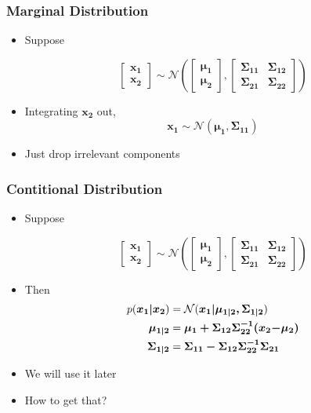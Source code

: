 \documentclass{beamer}
\begin{document}
\begin{frame}
	\frametitle{Marginal Distribution}
	\begin{itemize}
		\item Suppose

		\[\left[ {\begin{array}{*{20}{c}}
			{\bm{x_1}}\\
			{\bm{x_2}}
			\end{array}} \right] \sim \mathcal{N}\left( {\left[ {\begin{array}{*{20}{c}}
				{\bm{\mu _1}}\\
				{\bm{\mu _2}}
				\end{array}} \right],\left[ {\begin{array}{*{20}{c}}
				{\bm{\Sigma _{11}}}&{\bm{\Sigma _{12}}}\\
				{\bm{\Sigma _{21}}}&{\bm{\Sigma _{22}}}
				\end{array}} \right]} \right)\]

		\item Integrating $\bm{x_2}$ out, 
		\[
			\bm{x_1} \sim \mathcal{N}(\bm{\mu_1}, \bm{\Sigma_{11}})
		\]
		\item Just drop irrelevant components
	\end{itemize}
\end{frame}

\begin{frame}
	\frametitle{Contitional Distribution}
	\begin{itemize}
		\item Suppose
		
		\[\left[ {\begin{array}{*{20}{c}}
			{\bm{x_1}}\\
			{\bm{x_2}}
			\end{array}} \right] \sim \mathcal{N}\left( {\left[ {\begin{array}{*{20}{c}}
				{\bm{\mu _1}}\\
				{\bm{\mu _2}}
				\end{array}} \right],\left[ {\begin{array}{*{20}{c}}
				{\bm{\Sigma _{11}}}&{\bm{\Sigma _{12}}}\\
				{\bm{\Sigma _{21}}}&{\bm{\Sigma _{22}}}
				\end{array}} \right]} \right)\]
		\item Then
		\begin{align*}
			p(\bm{x_1|x_2}) &= \mathcal{N}(\bm{x_1|\mu_{1|2}, \Sigma_{1|2}}) \\
			\bm{\mu_{1|2}} & = \bm{\mu _1 + \Sigma _{12}\Sigma _{22}^{ - 1}({x_2}{\rm{ - }}{\mu _2})} \\
			\bm{\Sigma_{1|2}} & = \bm{\Sigma _{11} - \Sigma _{12}\Sigma _{22}^{ - 1}\Sigma _{21}}
		\end{align*}
		\item{We will use it later}
		\item{How to get that?}
	\end{itemize}
\end{frame}
\end{document}
